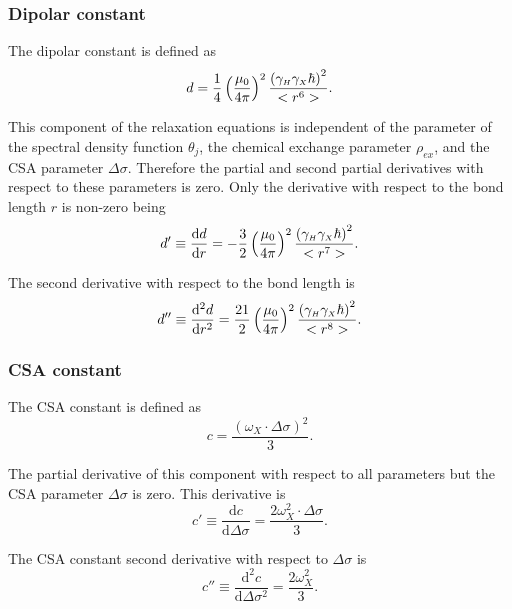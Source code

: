 \subsubsection{Dipolar constant}

The dipolar constant is defined as
\begin{equation}
    d = \frac{1}{4} \left(\frac{\mu_0}{4\pi}\right)^2 \frac{\left( \gamma_{\scriptscriptstyle H} \gamma_{\scriptscriptstyle X} \hbar \right)^2}{<r^6>}. \label{eq: Ri': d}
\end{equation}

\noindent This component of the relaxation equations is independent of the parameter of the spectral density function $\theta_j$, the chemical exchange parameter $\rho_{ex}$, and the CSA parameter $\Delta\sigma$.  Therefore the partial and second partial derivatives with respect to these parameters is zero.  Only the derivative with respect to the bond length $r$ is non-zero being
\begin{equation}
    d' \equiv \frac{\mathrm{d} d}{\mathrm{d} r} = - \frac{3}{2} \left(\frac{\mu_0}{4\pi}\right)^2 \frac{\left( \gamma_{\scriptscriptstyle H} \gamma_{\scriptscriptstyle X} \hbar \right)^2}{<r^7>}. \label{eq: Ri': d'}
\end{equation}

\noindent The second derivative with respect to the bond length is
\begin{equation}
    d'' \equiv \frac{\mathrm{d}^2 d}{\mathrm{d} r^2} = \frac{21}{2} \left(\frac{\mu_0}{4\pi}\right)^2 \frac{\left( \gamma_{\scriptscriptstyle H} \gamma_{\scriptscriptstyle X} \hbar \right)^2}{<r^8>}. \label{eq: Ri': d"}
\end{equation}


\subsubsection{CSA constant}

The CSA constant is defined as
\begin{equation}
    c = \frac{\left(\omega_X \cdot \Delta\sigma \right)^2}{3}. \label{eq: Ri': c}
\end{equation}

\noindent The partial derivative of this component with respect to all parameters but the CSA parameter $\Delta\sigma$ is zero.  This derivative is
\begin{equation}
    c' \equiv \frac{\mathrm{d} c}{\mathrm{d} \Delta\sigma} = \frac{2 \omega_X^2 \cdot \Delta\sigma}{3}. \label{eq: Ri': c'}
\end{equation}

\noindent The CSA constant second derivative with respect to $\Delta\sigma$ is
\begin{equation}
    c'' \equiv \frac{\mathrm{d}^2 c}{\mathrm{d} \Delta\sigma^2} = \frac{2 \omega_X^2}{3}. \label{eq: Ri': c"}
\end{equation}


